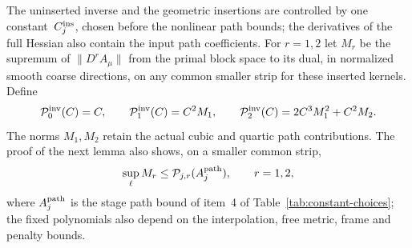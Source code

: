 The uninserted inverse and the geometric insertions are controlled by one constant~$C_j^{\rm ins}$, chosen before the nonlinear path bounds; the derivatives of the full Hessian also contain the input path coefficients. For $r=1,2$ let $M_r$ be the supremum of $\|D^rA_\mu\|$ from the primal block space to its dual, in normalized smooth coarse directions, on any common smaller strip for these inserted kernels. Define
\begin{equation*}
\mathcal P^{\rm inv}_0(C)=C,\qquad \mathcal P^{\rm inv}_1(C)=C^2M_1,\qquad
\mathcal P^{\rm inv}_2(C)=2C^3M_1^2+C^2M_2.
\end{equation*}
The norms $M_1,M_2$ retain the actual cubic and quartic path contributions. The proof of the next lemma also shows, on a smaller common strip,
\begin{equation}\label{eq:B-Mr}
\sup_\ell M_r\le\mathcal P_{j,r}(A_j^{\rm path}),\qquad r=1,2,
\end{equation}
where $A_j^{\rm path}$ is the stage path bound of item~4 of Table~\ref{tab:constant-choices}; the fixed polynomials also depend on the interpolation, free metric, frame and penalty bounds.

